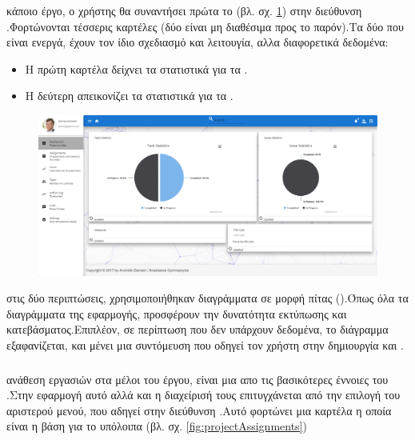 \subsubsection*{}
 κάποιο έργο, ο χρήστης θα συναντήσει πρώτα το  (βλ. σχ. \ref{fig:projectDashboard}) στην διεύθυνση .Φορτώνονται τέσσερις καρτέλες (δύο είναι μη διαθέσιμα προς το παρόν).Τα δύο που είναι ενεργά, έχουν τον ίδιο σχεδιασμό και λειτουγία, αλλα διαφορετικά δεδομένα:
\begin{itemize}
	\item Η πρώτη καρτέλα δείχνει τα στατιστικά για τα .
	\item Η δεύτερη απεικονίζει τα στατιστικά για τα .
\end{itemize}

\begin{figure}[!htb]
\includegraphics[width=\linewidth]{images/projectDashboard.png}
\caption{}
\label{fig:projectDashboard}
\end{figure}

 στις δύο περιπτώσεις, χρησιμοποιήθηκαν διαγράμματα σε μορφή πίτας ().Όπως όλα τα διαγράμματα της εφαρμογής, προσφέρουν την δυνατότητα εκτύπωσης και κατεβάσματος.Επιπλέον, σε περίπτωση που δεν υπάρχουν δεδομένα, το διάγραμμα εξαφανίζεται, και μένει μια συντόμευση που οδηγεί τον χρήστη στην δημιουργία  και .

\pagebreak

\subsubsection*{}
 ανάθεση εργασιών στα μέλοι του έργου, είναι μια απο τις βασικότερες έννοιες του .Στην εφαρμογή  αυτό αλλά και η διαχείρισή τους επιτυγχάνεται από την επιλογή  του αριστερού μενού, που αδηγεί στην διεύθυνση .Αυτό φορτώνει μια καρτέλα η οποία είναι η βάση για το υπόλοιπα (βλ. σχ. \ref{fig:projectAssignments})

